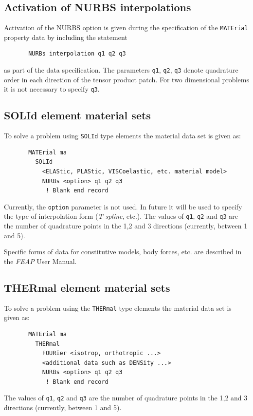 \subsection{Activation of NURBS interpolations}

Activation of the NURBS option is given during the
specification of the \texttt{MATErial} property data by including the
statement
\begin{verbatim}
       NURBs interpolation q1 q2 q3
\end{verbatim}
as part of the data specification.
The parameters \texttt{q1}, \texttt{q2}, \texttt{q3} denote quadrature order
in each direction of the tensor product patch.  For two dimensional problems
it is not necessary to specify \texttt{q3}.

\subsection{SOLId element material sets}

To solve a problem using \texttt{SOLId} type elements the material
data set is given as:
\begin{verbatim}
       MATErial ma
         SOLId
           <ELAStic, PLAStic, VISCoelastic, etc. material model>
           NURBs <option> q1 q2 q3
            ! Blank end record
\end{verbatim}
Currently, the \texttt{option} parameter is not used.  In future it
will be used to specify the type of interpolation form
(\textit{T-spline}, etc.).
The values of \texttt{q1}, \texttt{q2} and \texttt{q3} are the number of
quadrature points in the 1,2 and 3 directions (currently, between 1 and 5).

Specific forms of data for constitutive models, body forces, etc. are described
in the \textsl{FEAP} User Manual.

\subsection{THERmal element material sets}

To solve a problem using the \texttt{THERmal} type elements the
material data set is given as:
\begin{verbatim}
       MATErial ma
         THERmal
           FOURier <isotrop, orthotropic ...>
           <additional data such as DENSity ...>
           NURBs <option> q1 q2 q3
            ! Blank end record
\end{verbatim}
The values of \texttt{q1}, \texttt{q2} and \texttt{q3} are the number of
quadrature points in the 1,2 and 3 directions (currently, between 1 and 5).

